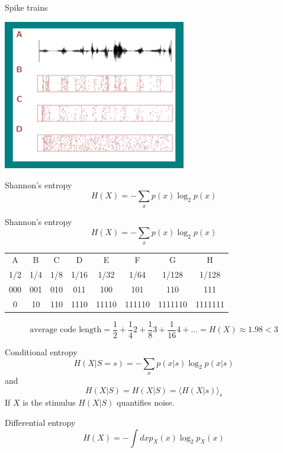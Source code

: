 \documentclass{beamer}
\begin{document}
\begin{frame}{Spike trains}
\color{reddish}
\begin{center}
\includegraphics[width=8cm]{SpikeTrains.png}
\end{center}
\end{frame}


\begin{frame}{Shannon's entropy}
\color{dark}
$$
H(X)=-\sum_x p(x)\log_2{p(x)}
$$
\color{black}
\end{frame}



\begin{frame}{Shannon's entropy}
\color{dark}
$$
H(X)=-\sum_x p(x)\log_2{p(x)}
$$
\color{black}
\begin{center}
\begin{tabular}{cccccccc}
A& B& C& D& E& F& G& H\\
1/2&1/4&1/8&1/16&1/32&1/64&1/128&1/128\\
000&001&010&011&100&101&110&111\\
0&10&110&1110&11110&111110&1111110&1111111
\end{tabular}
\end{center}
\color{dark}
$$
\mbox{average code length}=\frac{1}{2}+\frac{1}{4}2+\frac{1}{8}3+\frac{1}{16}4+\ldots = H(X)\approx 1.98 < 3
$$
\color{black}
\end{frame}

\begin{frame}{Conditional entropy}
\color{dark}
  $$
H(X|S=s)=-\sum_x p(x|s)\log_2{p(x|s)}
$$
\color{black}
and
\color{dark}
$$
H(X|S)=H(X|S)=\langle H(X|s)\rangle_s
$$
\color{black}
If $X$ is the stimulus $H(X|S)$ quantifies noise.
\end{frame}


\begin{frame}{Differential entropy}
  \color{dark}
$$
H(X)=-\int dx p_X(x)\log_2 {p_X(x)}
$$
\end{frame}
\end{document}
